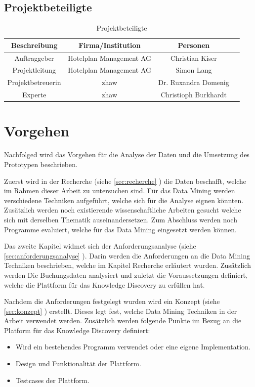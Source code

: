 \subsection{Projektbeteiligte}
\begin{table}[H] 
	\caption{Projektbeteiligte}
	\centering
	
	\begin{tabular}{ | c | c | c | c |} 
		\hline 
		\rowcolor{tableheadcolor}
		\bfseries Beschreibung & 
		\bfseries Firma/Institution & 
		\bfseries Personen \\ \hline 
		Auftraggeber & Hotelplan Management AG & Christian Kiser \\ \hline 
		Projektleitung & Hotelplan Management AG & Simon Lang\\ \hline 
		Projektbetreuerin &  \gls{zhaw} & Dr. Ruxandra Domenig \\ \hline 
		Experte & \gls{zhaw} & Christioph Burkhardt \\ \hline 
	\end{tabular} 
\end{table}

\section{Vorgehen}
\label{sec:einletung:vorgehen}
Nachfolged wird das Vorgehen für die Analyse der Daten und die Umsetzung des Prototypen beschrieben.

Zuerst wird in der Recherche (siehe \cref{sec:recherche} ) die Daten beschafft, welche im Rahmen dieser Arbeit zu untersuchen sind. Für das Data Mining werden verschiedene Techniken aufgeführt, welche sich für die Analyse eignen könnten. Zusätzlich werden noch existierende wissenschaftliche Arbeiten gesucht welche sich mit derselben Thematik auseinandersetzen. Zum Abschluss werden noch Programme evaluiert, welche für das Data Mining eingesetzt werden können.

Das zweite Kapitel widmet sich der Anforderungsanalyse (siehe \cref{sec:anforderungsanalyse} ). Darin werden die Anforderungen an die Data Mining Techniken beschrieben, welche im Kapitel Recherche erläutert wurden. Zusätzlich werden Die Buchungsdaten analysiert und zuletzt die Voraussetzungen definiert, welche die Plattform für das Knowledge Discovery zu erfüllen hat.

Nachdem die Anforderungen festgelegt wurden wird ein Konzept (siehe \cref{sec:konzept} ) erstellt. Dieses legt fest, welche Data Mining Techniken in der Arbeit verwendet werden. Zusätzlich werden folgende Punkte im Bezug an die Platform für das Knowledge Discovery definiert:
\begin{itemize}
	\item Wird ein bestehendes Programm verwendet oder eine eigene Implementation.
	\item Design und Funktionalität der Plattform.
	\item Testcases der Plattform.
\end{itemize}

